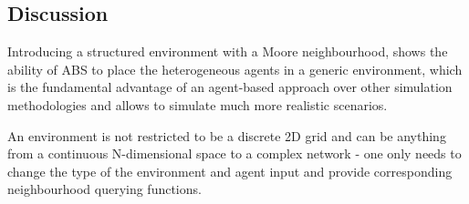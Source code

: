 \subsection{Discussion}
Introducing a structured environment with a Moore neighbourhood, shows the ability of ABS to place the heterogeneous agents in a generic environment, which is the fundamental advantage of an agent-based approach over other simulation methodologies and allows to simulate much more realistic scenarios.

An environment is not restricted to be a discrete 2D grid and can be anything from a continuous N-dimensional space to a complex network - one only needs to change the type of the environment and agent input and provide corresponding neighbourhood querying functions. 